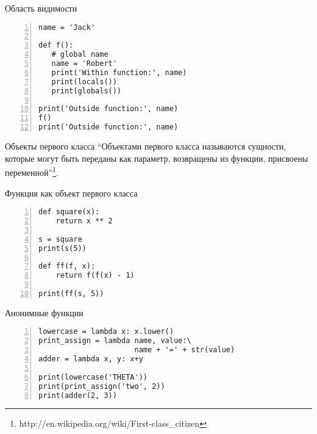 \documentclass[hyperref={pdftex,unicode}]{beamer}
\begin{document}
\begin{frame}[fragile]{Область видимости}
  \begin{lstlisting}[numbers=left]
name = 'Jack'

def f():
   # global name
   name = 'Robert'
   print('Within function:', name)
   print(locals())
   print(globals())

print('Outside function:', name)
f()
print('Outside function:', name)
\end{lstlisting}
\end{frame}

\begin{frame}{Объекты первого класса}
  ``Объектами первого класса называются сущности,
  которые могут быть переданы как параметр,
  возвращены из функции, присвоены переменной''\footnote[frame]{
    http://en.wikipedia.org/wiki/First-class\_citizen}.
\end{frame}

\begin{frame}[fragile]{Функция как объект первого класса}
  \begin{lstlisting}[numbers=left]
def square(x):
    return x ** 2

s = square
print(s(5))

def ff(f, x):
    return f(f(x) - 1)

print(ff(s, 5))
\end{lstlisting}
\end{frame}

\begin{frame}[fragile]{Анонимные функции}
  \begin{lstlisting}[numbers=left]
lowercase = lambda x: x.lower()
print_assign = lambda name, value:\
                      name + '=' + str(value)
adder = lambda x, y: x+y

print(lowercase('THETA'))
print(print_assign('two', 2))
print(adder(2, 3))
\end{lstlisting}
\end{frame}
\end{document}
